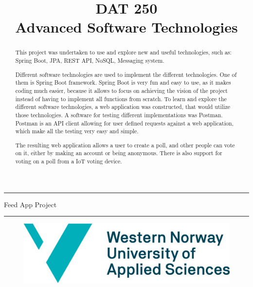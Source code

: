 \documentclass[11pt]{article}
\begin{document}

\title{DAT 250\\Advanced Software Technologies}


\maketitle
\noindent\rule{\textwidth}{1.6pt}\vspace*{\baselineskip}\vspace{2pt}
\vspace{0.75\baselineskip}
{\huge \centering
Feed App Project\\}
\vspace{0.75\baselineskip}
\noindent\rule{\textwidth}{1.6pt}\vspace*{-\baselineskip}\vspace{2pt}
\vspace{9pc}
\begin{figure}[H]
  \centering
  \includegraphics[scale=0.5]{figs/HVL_logo.jpg}
  \label{fig:logo}
\end{figure}
\newpage

\tableofcontents
\newpage
{}
\begin{abstract}

  This project was undertaken to use and explore new and useful technologies, such as: Spring Boot, JPA, REST API, NoSQL, Messaging system.
  
  Different software technologies are used to implement the different technologies. One of them is Spring Boot framework. Spring Boot is very fun and easy to use, as it makes coding much easier, because it allows to focus on achieving the vision of the project instead of having to implement all functions from scratch. To learn and explore the different software technologies, a web application was constructed, that would utilize those technologies. A software for testing different implementations was Postman. Postman is an API client allowing for user defined requests against a web application, which make all the testing very easy and simple.
  
  The resulting web application allows a user to create a poll, and other people can vote on it, either by making an account or being anonymous. There is also support for voting on a poll from a IoT voting device.

\end{abstract}
\newpage
\end{document}
